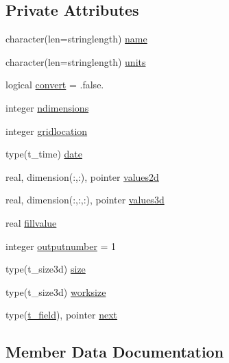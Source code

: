 \subsection*{Private Attributes}
\begin{DoxyCompactItemize}
\item 
character(len=stringlength) \mbox{\hyperlink{structmodulecfformat_1_1t__field_ae6f9f8fcae06282872ffd5f5e187b060}{name}}
\item 
character(len=stringlength) \mbox{\hyperlink{structmodulecfformat_1_1t__field_a5472b38383c6628448bf05ffd5f0965f}{units}}
\item 
logical \mbox{\hyperlink{structmodulecfformat_1_1t__field_aee6aecfb05fc1408fa4716b173a683fd}{convert}} = .false.
\item 
integer \mbox{\hyperlink{structmodulecfformat_1_1t__field_aaad98fe31df6cb775a3bab252f3c84b0}{ndimensions}}
\item 
integer \mbox{\hyperlink{structmodulecfformat_1_1t__field_ac5f93559a93112c9aee2f733ae4a0fdb}{gridlocation}}
\item 
type(t\+\_\+time) \mbox{\hyperlink{structmodulecfformat_1_1t__field_a34e024879a712252c8d44bc12fbc757a}{date}}
\item 
real, dimension(\+:,\+:), pointer \mbox{\hyperlink{structmodulecfformat_1_1t__field_ad9a04b2a738fdd697e9c2d065b0158e4}{values2d}}
\item 
real, dimension(\+:,\+:,\+:), pointer \mbox{\hyperlink{structmodulecfformat_1_1t__field_a95f3da64caf70d29fb9770eb2583c22f}{values3d}}
\item 
real \mbox{\hyperlink{structmodulecfformat_1_1t__field_a7721061f8e2291d0e7b57aa2d0a4d6bc}{fillvalue}}
\item 
integer \mbox{\hyperlink{structmodulecfformat_1_1t__field_aead5eebe78d5b1888220714fc01f68ea}{outputnumber}} = 1
\item 
type(t\+\_\+size3d) \mbox{\hyperlink{structmodulecfformat_1_1t__field_a3ee042034083dcffb3bf736d0bd474cf}{size}}
\item 
type(t\+\_\+size3d) \mbox{\hyperlink{structmodulecfformat_1_1t__field_a309689128789a7d5dd913d3f40385e53}{worksize}}
\item 
type(\mbox{\hyperlink{structmodulecfformat_1_1t__field}{t\+\_\+field}}), pointer \mbox{\hyperlink{structmodulecfformat_1_1t__field_a56c774956ed1a06b7b533f86c93d8493}{next}}
\end{DoxyCompactItemize}


\subsection{Member Data Documentation}
\mbox{\label{structmodulecfformat_1_1t__field_aee6aecfb05fc1408fa4716b173a683fd}} 
